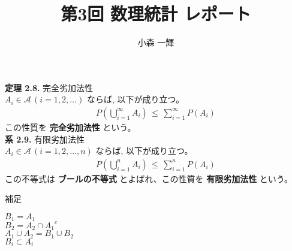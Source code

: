 \documentclass[dvipdfmx,10pt, a4j]{jarticle}
\title{第3回 数理統計 レポート}
\author{小森 一輝}
\theoremstyle{definition}
\begin{document}
    \maketitle

    \setcounter{section}{2}
    \noindent
    \textbf{定理 2.8.} 完全劣加法性\\
    $A_i \in \mathcal{A}\, (i = 1, 2, \dots)$ ならば, 以下が成り立つ。\\
    \begin{align*}
        P(\bigcup_{i=1}^{\infty}{A_i}) \, \leq \, \sum_{i=1}^{\infty}P(A_i)
    \end{align*}
    この性質を \textbf{完全劣加法性} という。\\

    \noindent
    \textbf{系 2.9.} 有限劣加法性\\
    $A_i \in \mathcal{A}\, (i = 1, 2, \dots, n)$ ならば, 以下が成り立つ。\\
    \begin{align*}
        P(\bigcup_{i=1}^{n}{A_i}) \, \leq \, \sum_{i=1}^{n}P(A_i)
    \end{align*}
    この不等式は \textbf{ブールの不等式} とよばれ、この性質を \textbf{有限劣加法性} という。\\

    \begin{itembox}[l]{補足}
        \begin{flushleft}
            $B_1 = A_1$\\
            $B_2 = A_2 \cap {A_1}^{c}$\\
            $A_1 \cup A_2 = B_1 \cup B_2$\\
            $B_i \subset A_i$
        \end{flushleft}
    \end{itembox}
\end{document}
